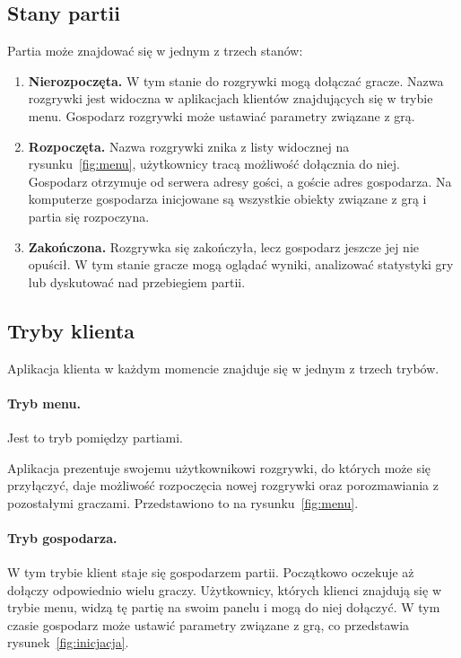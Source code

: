 \documentclass[a4paper, 12pt]{article}
\begin{document}
\subsection{Stany partii}
Partia może znajdować się w jednym z trzech stanów:
\begin{enumerate}
 \item \textbf{Nierozpoczęta.} W tym stanie do rozgrywki mogą dołączać gracze. Nazwa rozgrywki jest widoczna w aplikacjach klientów znajdujących się w trybie menu. Gospodarz rozgrywki może ustawiać parametry związane z grą. 

 \item \textbf{Rozpoczęta.} Nazwa rozgrywki znika z listy widocznej na rysunku~\ref{fig:menu}, użytkownicy tracą możliwość dołącznia do niej. Gospodarz otrzymuje od serwera adresy gości, a goście adres gospodarza. Na komputerze gospodarza inicjowane są wszystkie obiekty związane z grą i partia się rozpoczyna.

 \item \textbf{Zakończona.} Rozgrywka się zakończyła, lecz gospodarz jeszcze jej nie opuścił. W tym stanie gracze mogą oglądać wyniki, analizować statystyki gry lub dyskutować nad przebiegiem partii.
\end{enumerate}

\subsection{Tryby klienta}
Aplikacja klienta w każdym momencie znajduje się w jednym z trzech trybów.

\paragraph{Tryb menu.} Jest to tryb pomiędzy partiami.

Aplikacja prezentuje swojemu użytkownikowi rozgrywki, do których może się przyłączyć, daje możliwość rozpoczęcia nowej rozgrywki oraz porozmawiania z pozostałymi graczami. Przedstawiono to na rysunku~\ref{fig:menu}. 

\paragraph{Tryb gospodarza.} W tym trybie klient staje się gospodarzem partii. Początkowo oczekuje aż dołączy odpowiednio wielu graczy. Użytkownicy, których klienci znajdują się w trybie menu, widzą tę partię na swoim panelu i mogą do niej dołączyć. W tym czasie gospodarz może ustawić parametry związane z grą, co przedstawia rysunek~\ref{fig:inicjacja}.
\end{document}
